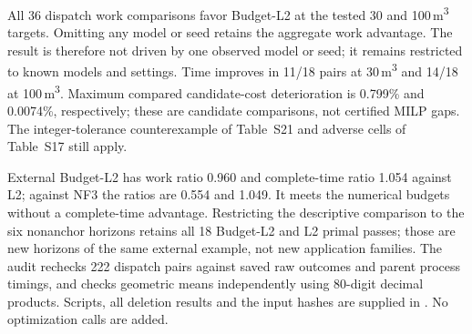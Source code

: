 \documentclass[11pt]{article}
\begin{document}
\begin{table}[!htbp]
\centering\small
\caption{Secondary checks on observed outcomes. Top: paired Budget-L2/NF3 work
ratios on the six known dispatch models and seeds 59,71,89. Deletion columns
give the range of geometric-mean work ratios after omitting each complete model
or each complete seed in turn, retaining the remaining pairs. These ranges are
not confidence intervals. Work/time wins count individual pairs with ratio below
one; all 18 Budget-L2 points at each target meet the budgets without detected B/G
contradictions. Bottom: all eight external batch-scheduling horizons and seeds
131,137,149, with paired work and complete-time ratios against L2. Unknown bound
checks are retained: each policy has only three of 24 checks with an exact feasible
reference, and 21 unknown. Time is measured on a shared host and excludes
compilation and prior witness acquisition.}
\label{tab:evidence-robustness}

\par\medskip

\end{table}

All 36 dispatch work comparisons favor Budget-L2 at the tested 30 and
100\,m\textsuperscript{3} targets. Omitting any model or seed retains the aggregate
work advantage. The result is therefore not driven by one observed model or
seed; it remains restricted to known models and settings. Time improves in 11/18
pairs at 30\,m\textsuperscript{3} and 14/18 at 100\,m\textsuperscript{3}.
Maximum compared candidate-cost deterioration is 0.799\% and 0.0074\%, respectively;
these are candidate comparisons, not certified MILP gaps. The integer-tolerance
counterexample of Table~S21 and adverse cells of Table~S17 still apply.

External Budget-L2 has work ratio 0.960 and complete-time ratio 1.054 against
L2; against NF3 the ratios are 0.554 and 1.049. It meets the numerical budgets
without a complete-time advantage. Restricting the descriptive comparison to the
six nonanchor horizons retains all 18 Budget-L2 and L2 primal passes; those are
new horizons of the same external example, not new application families.
The audit rechecks 222 dispatch pairs against saved raw outcomes and parent
process timings, and checks geometric means independently using 80-digit decimal
products. Scripts, all deletion results and the input hashes are supplied in
. No optimization calls are added.

\FloatBarrier
\end{document}
